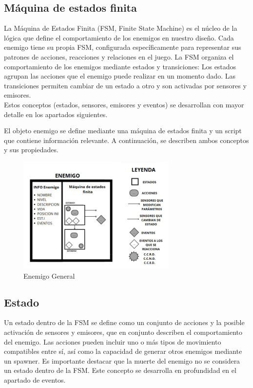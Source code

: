\subsection{Máquina de estados finita}

La Máquina de Estados Finita (FSM, Finite State Machine) es el núcleo de la lógica que define el comportamiento de los enemigos en nuestro diseño. Cada enemigo tiene su propia FSM, configurada específicamente para representar sus patrones de acciones, reacciones y relaciones en el juego. La FSM organiza el comportamiento de los enemigos mediante estados y transiciones:
Los estados agrupan las acciones que el enemigo puede realizar en un momento dado.
Las transiciones permiten cambiar de un estado a otro y son activadas por sensores y emisores.\\
Estos conceptos (estados, sensores, emisores y eventos) se desarrollan con mayor detalle en los apartados siguientes.

El objeto enemigo se define mediante una máquina de estados finita y un script que contiene información relevante. A continuación, se describen ambos conceptos y sus propiedades.\\
\begin{figure}[t]
	\centering
	\includegraphics[width = 0.7\textwidth]{Imagenes/EnemigoGeneral.png}
	\caption{Enemigo General }
	\label{fig:EnemigoGeneral}
\end{figure}

\subsection{Estado}
Un estado dentro de la FSM se define como un conjunto de acciones y la posible activación de sensores y emisores, que en conjunto describen el comportamiento del enemigo. Las acciones pueden incluir uno o más tipos de movimiento compatibles entre sí, así como la capacidad de generar otros enemigos mediante un spawner.
Es importante destacar que la muerte del enemigo no se considera un estado dentro de la FSM. Este concepto se desarrolla en profundidad en el apartado de eventos.\\

